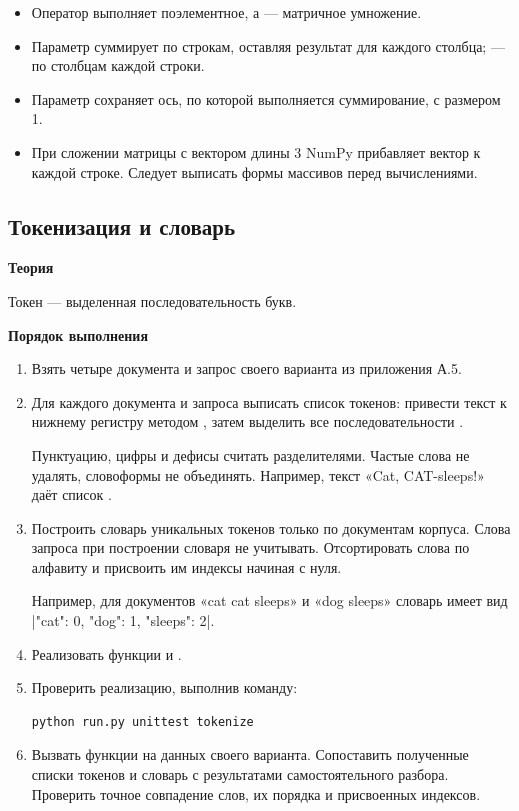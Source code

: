 \documentclass[12pt,a4paper]{article}
\newcommand{\micro}[1]{\subsection{#1}}
\newcommand{\taskhead}[1]{\par\textbf{#1}\par}
\begin{document}
\begin{itemize}
\item Оператор \func{*} выполняет поэлементное, а  --- матричное
умножение. 

\item Параметр  суммирует по строкам, оставляя
результат для каждого столбца;  --- по столбцам каждой строки.

\item Параметр  сохраняет ось, по которой выполняется суммирование, с размером 1. 

\item При сложении
матрицы с вектором длины 3 NumPy прибавляет вектор к каждой строке. Следует выписать формы массивов перед вычислениями.

\end{itemize}

\newpage

\micro{Токенизация и словарь}
\taskhead{Теория}
Токен --- выделенная последовательность букв. 

\taskhead{Порядок выполнения}

\begin{enumerate}
  \item Взять четыре документа и запрос своего варианта
  из приложения А.5.
  \item Для каждого документа и запроса выписать список токенов:
  привести текст к нижнему регистру методом ,
  затем выделить все последовательности \func{[a-z]+}. 

  Пунктуацию, цифры и дефисы считать разделителями.
  Частые слова не удалять, словоформы не объединять.
  Например, текст «Cat, CAT-sleeps!» даёт список
  .
  \item Построить словарь уникальных токенов только
  по документам корпуса. Слова запроса при построении
  словаря не учитывать.
  Отсортировать слова по алфавиту и присвоить им
  индексы начиная с нуля.

  Например, для документов «cat cat sleeps» и «dog sleeps»
  словарь имеет вид \func|{"cat": 0, "dog": 1, "sleeps": 2}|.
  \item Реализовать функции 
  и .
  \item Проверить реализацию, выполнив команду:
  \begin{lstlisting}[style=commands]
  python run.py unittest tokenize\end{lstlisting}
  \item Вызвать функции на данных своего варианта.
  Сопоставить полученные списки токенов и словарь
  с результатами самостоятельного разбора.
  Проверить точное совпадение слов, их порядка
  и присвоенных индексов.
\end{enumerate}
\end{document}

